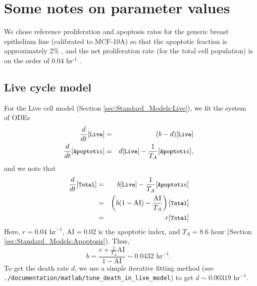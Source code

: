 \documentclass[12pt]{article}
\newcommand{\beq}{\begin{equation}}
\newcommand{\eeq}{\end{equation}}
\newcommand{\beqa}{\begin{eqnarray}}
\newcommand{\eeqa}{\end{eqnarray}}
\renewcommand{\v}{\verb}
\renewcommand{\tt}[1]{{\small \left[\texttt{#1}\right] }}
\newcommand{\blue}[1]{\textcolor{blue}{#1}}
\newcommand{\DONE}{}%
\begin{document}




\section{Some notes on parameter values}
%
%
%
%
%
We chose reference proliferation and apoptosis rates for  the 
generic breast epithelium line (calibrated to MCF-10A) 
so that the apoptotic fraction is approximately 2\% 
\cite{ref:MCF10A_apoptosis}, and the net proliferation rate 
(for the total cell population) is on the 
order of 0.04 hr${}^\textrm{-1}$ \cite{ref:MultiCellDS,ref:MCF10A-NeoST,ref:MCF10A_PSON}. 

\subsection{Live cycle model}
\label{sec:parameters:live}
For the Live cell model (Section \ref{sec:Standard_Models:Live}), we fit the 
system of ODEs
\beqa
\frac{d}{dt}\tt{Live} & = & (b-d)\tt{Live} \\
\frac{d}{dt}\tt{Apoptotic} & = & d\tt{Live} - \frac{1}{T_A} \tt{Apoptotic}, 
\eeqa
and we note that 
\beqa
\frac{d}{dt}\tt{Total} 
& = & b \tt{Live} - \frac{1}{T_A} \tt{Apoptotic} \nonumber \\ 
& = & \left( b (1-\textrm{AI}) - \frac{\textrm{AI}}{T_A} \right) \tt{Total} \nonumber \\ 
& = & r \tt{Total} 
\eeqa
Here, $r = 0.04\textrm{ hr}^{-1}$, $\textrm{AI} = 0.02$ is the apoptotic index, and
$T_A = 8.6 \textrm{ hour}$ (Section \ref{sec:Standard_Models:Apoptosis}). Thus, 
\beq
b = \frac{r + \frac{1}{T_A}\textrm{AI}}{1 - \textrm{AI}} \sim 0.0432 \textrm{ hr}^{-1}. 
\eeq
To get the death rate $d$, we use a simple iterative fitting method 
(see \\
\v|./documentation/matlab/tune_death_in_live_model|) to get $d \sim 0.00319 \textrm{ hr}^{-1}$. 
\end{document}
